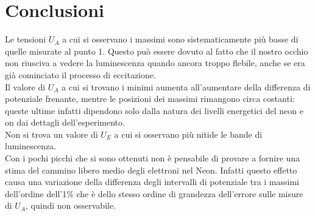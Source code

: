 \documentclass[10pt,a4paper]{article}
\begin{document}
\section{Conclusioni}
Le tensioni $U_A$ a cui si osservano i massimi sono sistematicamente più basse di quelle misurate al punto 1. Questo può essere dovuto al fatto che il nostro occhio non riusciva a vedere la luminescenza quando ancora troppo flebile, anche se era già cominciato il processo di eccitazione.\\
Il valore di $U_A$ a cui si trovano i minimi aumenta all'aumentare della differenza di potenziale frenante, mentre le posizioni dei massimi rimangono circa costanti: queste ultime infatti dipendono solo dalla natura dei livelli energetici del neon e on dai dettagli dell'esperimento.\\
Non si trova un valore di $U_E$ a cui si osservano più nitide le bande di luminescenza.\\
Con i pochi picchi che si sono ottenuti non è pensabile di provare a fornire una stima del cammino libero medio degli elettroni nel Neon. Infatti questo effetto causa una variazione della differenza degli intervalli di potenziale tra i massimi dell'ordine dell'1\% che è dello stesso ordine di grandezza dell'errore sulle misure di $U_A$, quindi non osservabile.
\end{document}
